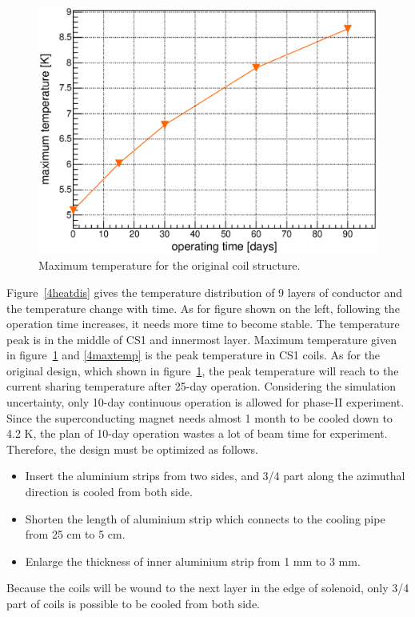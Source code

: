 \begin{figure}[H]
 \centering
 \includegraphics[scale=0.43]{chapter5/fig/temp.eps}
 \caption{ Maximum temperature for the original coil structure.}
 \label{origin}
\end{figure}
Figure~\ref{4heatdis} gives the temperature distribution of 9 layers of conductor and the temperature change with time.
As for figure shown on the left, following the operation time increases, it needs more time to become stable.
The temperature peak is in the middle of CS1 and innermost layer.
Maximum temperature given in figure~\ref{origin} and \ref{4maxtemp} is the peak temperature in CS1 coils.
As for the original design, which shown in figure~\ref{origin}, the peak temperature will reach to the current sharing temperature after 25-day operation.
Considering the simulation uncertainty, only 10-day continuous operation is allowed for phase-II experiment.
Since the superconducting magnet needs almost 1 month to be cooled down to 4.2 K, the plan of 10-day operation wastes a lot of beam time for experiment.
Therefore, the design must be optimized as follows.
\begin{itemize}
 \setlength{\itemsep}{-5pt}
 \item Insert the aluminium strips from two sides, and 3/4 part along the azimuthal direction is cooled from both side.
 \item Shorten the length of aluminium strip which connects to the cooling pipe from 25 cm to 5 cm.
 \item Enlarge the thickness of inner aluminium strip from 1 mm to 3 mm. 
\end{itemize}
Because the coils will be wound to the next layer in the edge of solenoid, only 3/4 part of coils is possible to be cooled from both side.
